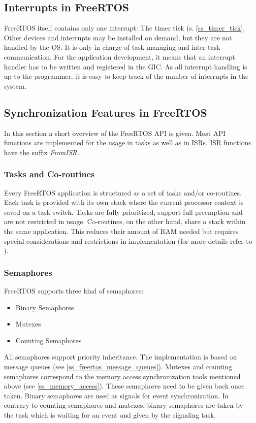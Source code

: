 \subsection{Interrupts in FreeRTOS}\label{ss_interrupts_in_freertos}
FreeRTOS itself contains only one interrupt: The timer tick (s. \ref{ss_timer_tick}.
Other devices and interrupts may be installed on demand, but they are not handled by the OS. 
It is only in charge of task managing and inter-task communication.
For the application development, it means that an interrupt handler has to be written and registered in the \ac{GIC}.
As all interrupt handling is up to the programmer, it is easy to keep track of the number of interrupts in the system.

\subsection{Synchronization Features in FreeRTOS}
In this section a short overview of the FreeRTOS \ac{API} is given.
Most \ac{API} functions are implemented for the usage in tasks as well as in \acp{ISR}.
\ac{ISR} functions have the suffix \textit{FromISR}.

\subsubsection{Tasks and Co-routines}
Every FreeRTOS application is structured as a set of tasks and/or co-routines.
Each task is provided with its own stack where the current processor context is saved on a task switch.
Tasks are fully prioritized, support full preemption and are not restricted in usage.
Co-routines, on the other hand, share a stack within the same application. 
This reduces their amount of \ac{RAM} needed but requires special considerations and restrictions in implementation (for more details refer to \cite{freertos_coroutines_tasks}).

\subsubsection{Semaphores}
FreeRTOS supports three kind of semaphores:
\begin{itemize}
	\item Binary Semaphores
	\item Mutexes
	\item Counting Semaphores
\end{itemize}
All semaphores support priority inheritance.
The implementation is based on message queues (see \ref{ss_freertos_message_queues}).
Mutexes and counting semaphores correspond to the memory access synchronization tools mentioned above (see \ref{ss_memory_access}).
These semaphores need to be given back once taken.
Binary semaphores are used as signals for event synchronization.
In contrary to counting semaphores and mutexes, binary semaphores are taken by the task which is waiting for an event and given by the signaling task. 

